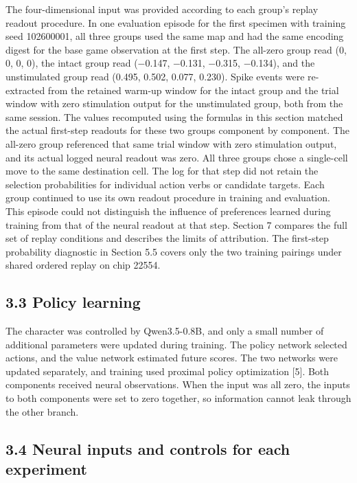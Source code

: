 \documentclass{article}
\begin{document}
The four-dimensional input was provided according to each group's replay readout procedure. In one evaluation episode for the first specimen with training seed 102600001, all three groups used the same map and had the same encoding digest for the base game observation at the first step. The all-zero group read (0, 0, 0, 0), the intact group read (\ensuremath{-}0.147, \ensuremath{-}0.131, \ensuremath{-}0.315, \ensuremath{-}0.134), and the unstimulated group read (0.495, 0.502, 0.077, 0.230). Spike events were re-extracted from the retained warm-up window for the intact group and the trial window with zero stimulation output for the unstimulated group, both from the same session. The values recomputed using the formulas in this section matched the actual first-step readouts for these two groups component by component. The all-zero group referenced that same trial window with zero stimulation output, and its actual logged neural readout was zero. All three groups chose a single-cell move to the same destination cell. The log for that step did not retain the selection probabilities for individual action verbs or candidate targets. Each group continued to use its own readout procedure in training and evaluation. This episode could not distinguish the influence of preferences learned during training from that of the neural readout at that step. Section 7 compares the full set of replay conditions and describes the limits of attribution. The first-step probability diagnostic in Section 5.5 covers only the two training pairings under shared ordered replay on chip 22554.


\subsection*{3.3 Policy learning}


The character was controlled by Qwen3.5-0.8B, and only a small number of additional parameters were updated during training. The policy network selected actions, and the value network estimated future scores. The two networks were updated separately, and training used proximal policy optimization [5]. Both components received neural observations. When the input was all zero, the inputs to both components were set to zero together, so information cannot leak through the other branch.


\subsection*{3.4 Neural inputs and controls for each experiment}
\end{document}
